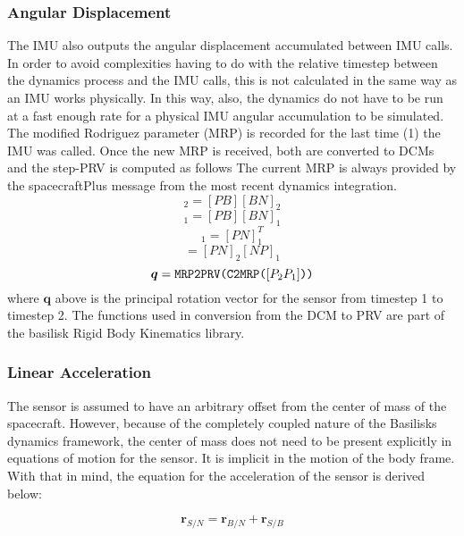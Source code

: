 \subsubsection{Angular Displacement}
The IMU also outputs the angular displacement accumulated between IMU calls. In order to avoid complexities having to do with the relative timestep between the dynamics process and the IMU calls, this is not calculated in the same way as an IMU works physically. In this way, also, the dynamics do not have to be run at a fast enough rate for a physical IMU angular accumulation to be simulated. 
The modified Rodriguez parameter (MRP) is recorded for the last time (1) the IMU was called. Once the new MRP is received, both are converted to DCMs and the step-PRV is computed as follows The current MRP is always provided by the spacecraftPlus message from the most recent dynamics integration.
\begin{equation}
	[PN]_2 = [PB][BN]_2
\end{equation}
\begin{equation}
	[PN]_1 = [PB][BN]_1
\end{equation}
\begin{equation}
	[NP]_1 = [PN]_1^T
\end{equation}
\begin{equation}
	[P_2P_1] = [PN]_2[NP]_1
\end{equation}
\begin{equation}
\bm{q} = \verb|MRP2PRV(C2MRP(|[P_2P_1]\verb|))|
\end{equation}
where $\bm{q}$ above is the principal rotation vector for the sensor from timestep 1 to timestep 2. The functions used in conversion from the DCM to PRV are part of the basilisk Rigid Body Kinematics library.

\subsubsection{Linear Acceleration}
The sensor is assumed to have an arbitrary offset from the center of mass of the spacecraft. However, because of the completely coupled nature of the Basilisks dynamics framework, the center of mass does not need to be present explicitly in equations of motion for the sensor. It is implicit in the motion of the body frame. With that in mind, the equation for the acceleration of the sensor is derived below:

\begin{equation}
\bm{r}_{S/N} = \bm{r}_{B/N} + \bm{r}_{S/B}
\end{equation}

